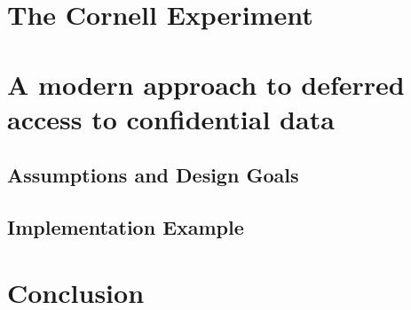 \documentclass[12pt,titlepage]{article}
\begin{document}
\section{The Cornell Experiment}
\label{sec:sdshistory}

%

\section{A modern approach to deferred access to confidential data}
\label{sec:modernapproach}

\subsection{Assumptions and Design Goals}
\label{sec:approach:goals}


\subsection{Implementation Example}
\label{sec:approach:example}




\section{Conclusion}
\label{sec:conclusion}



\clearpage
\singlespacing

	
	

%	
	\newpage

\clearpage
\appendix
\setcounter{section}{0}
\label{sec:appendix}

\end{document}
